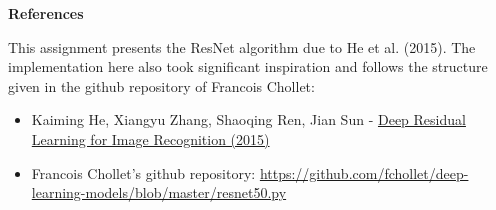 {\textbf {References}}

This assignment presents the ResNet algorithm due to He et al. (2015). The implementation here also took significant inspiration and follows the structure given in the github repository of Francois Chollet:
\begin{itemize}
\item Kaiming He, Xiangyu Zhang, Shaoqing Ren, Jian Sun - \href{https://arxiv.org/abs/1512.03385}{Deep Residual Learning for Image Recognition (2015)}
\item Francois Chollet's github repository: \url{https://github.com/fchollet/deep-learning-models/blob/master/resnet50.py}
\end{itemize}

\clearpage